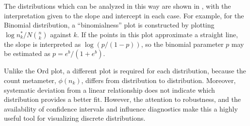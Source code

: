 \documentclass[11pt]{book}\usepackage[]{graphicx}\usepackage[]{color}
\begin{document}
The distributions which can be analyzed in this way are shown in
, with the interpretation given to the
slope and intercept in each case.
For example, for the Binomial distribution, a ``binomialness''
plot is constructed by plotting $\log n_k^{*} / N \binom{n}{k}$
against $k$.  If the points in this plot approximate a straight
line, the slope is interpreted as $\log (p/(1-p))$, so the
binomial parameter $p$ may be estimated as $p = e^b/(1+e^b)$.


Unlike the Ord plot, a different plot is required for each distribution,
because the count metameter, \(\phi ( n_k )\), differs
from distribution to distribution.
Moreover, systematic deviation from a linear relationship does not
       indicate which distribution provides a better fit.
However, the attention to robustness, and the availability of confidence
intervals and influence diagnostics make this a highly useful tool
for visualizing discrete distributions.
\end{document}
